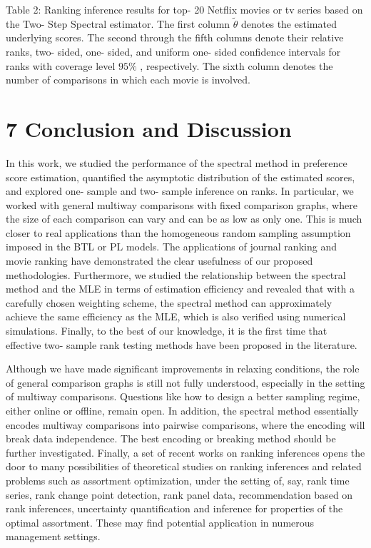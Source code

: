 Table 2: Ranking inference results for top- 20 Netflix movies or tv
series based on the Two- Step Spectral estimator. The first column
\(\widetilde{\theta}\) denotes the estimated underlying scores. The
second through the fifth columns denote their relative ranks, two-
sided, one- sided, and uniform one- sided confidence intervals for ranks
with coverage level \(95\%\) , respectively. The sixth column denotes
the number of comparisons in which each movie is involved.

\section{7 Conclusion and Discussion}\label{conclusion-and-discussion}

In this work, we studied the performance of the spectral method in
preference score estimation, quantified the asymptotic distribution of
the estimated scores, and explored one- sample and two- sample inference
on ranks. In particular, we worked with general multiway comparisons
with fixed comparison graphs, where the size of each comparison can vary
and can be as low as only one. This is much closer to real applications
than the homogeneous random sampling assumption imposed in the BTL or PL
models. The applications of journal ranking and movie ranking have
demonstrated the clear usefulness of our proposed methodologies.
Furthermore, we studied the relationship between the spectral method and
the MLE in terms of estimation efficiency and revealed that with a
carefully chosen weighting scheme, the spectral method can approximately
achieve the same efficiency as the MLE, which is also verified using
numerical simulations. Finally, to the best of our knowledge, it is the
first time that effective two- sample rank testing methods have been
proposed in the literature.

Although we have made significant improvements in relaxing conditions,
the role of general comparison graphs is still not fully understood,
especially in the setting of multiway comparisons. Questions like how to
design a better sampling regime, either online or offline, remain open.
In addition, the spectral method essentially encodes multiway
comparisons into pairwise comparisons, where the encoding will break
data independence. The best encoding or breaking method should be
further investigated. Finally, a set of recent works on ranking
inferences opens the door to many possibilities of theoretical studies
on ranking inferences and related problems such as assortment
optimization, under the setting of, say, rank time series, rank change
point detection, rank panel data, recommendation based on rank
inferences, uncertainty quantification and inference for properties of
the optimal assortment. These may find potential application in numerous
management settings.

